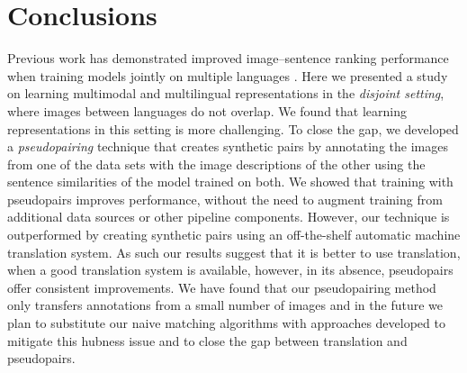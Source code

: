 \section{Conclusions}

Previous work has demonstrated improved image--sentence ranking performance
when training models jointly on multiple languages \citep{gella2017image,kadar2018conll}. Here we presented a study on learning multimodal
and multilingual representations in the \emph{disjoint setting}, where
images between languages do not overlap.
We found that learning representations in this
setting is more challenging. 
To close the gap, we developed a \emph{pseudopairing} 
technique that creates synthetic pairs by annotating the
images from one of the data sets with the image 
descriptions of the other using the
sentence similarities of the model trained on both. 
We showed that training with pseudopairs 
improves performance,
without the need to augment training from additional 
data sources or other pipeline components. 
However, our technique is outperformed
by creating synthetic pairs using an off-the-shelf automatic machine translation system. 
As such our results suggest that it is better to 
use translation, when a good translation system 
is available, however, in its absence, pseudopairs
offer consistent improvements. 
We have found that our pseudopairing method only transfers annotations from a small number of images and in the future we plan to substitute our naive matching algorithms
with approaches developed to mitigate this hubness issue \citep{radovanovic2010existence} and to close the gap between translation and pseudopairs.%